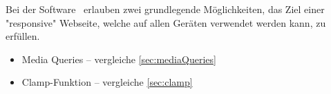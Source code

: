 

Bei der Software \ZELIA\ erlauben zwei grundlegende Möglichkeiten, das Ziel einer "responsive" Webseite, welche auf allen Geräten verwendet werden kann, zu erfüllen.

\begin{itemize}
    \item Media Queries -- vergleiche \ref{sec:mediaQueries}
    \item Clamp-Funktion -- vergleiche \ref{sec:clamp}
\end{itemize}



\clearpage
